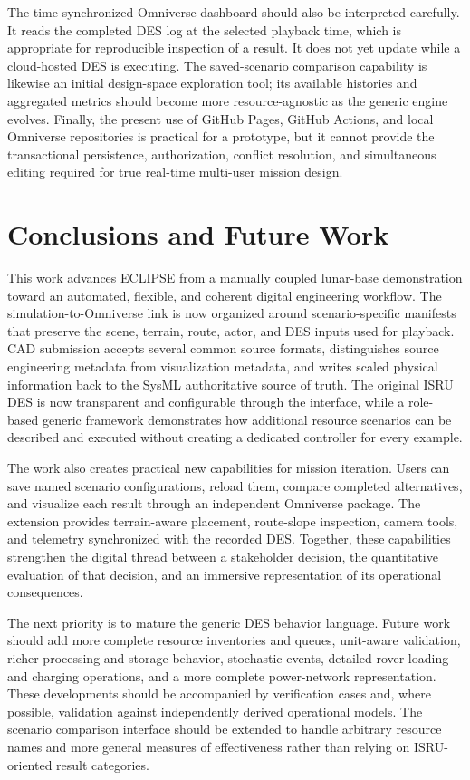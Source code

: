The time-synchronized Omniverse dashboard should also be interpreted carefully. It reads the completed DES log at the selected playback time, which is appropriate for reproducible inspection of a result. It does not yet update while a cloud-hosted DES is executing. The saved-scenario comparison capability is likewise an initial design-space exploration tool; its available histories and aggregated metrics should become more resource-agnostic as the generic engine evolves. Finally, the present use of GitHub Pages, GitHub Actions, and local Omniverse repositories is practical for a prototype, but it cannot provide the transactional persistence, authorization, conflict resolution, and simultaneous editing required for true real-time multi-user mission design.

\section{Conclusions and Future Work}

This work advances ECLIPSE from a manually coupled lunar-base demonstration toward an automated, flexible, and coherent digital engineering workflow. The simulation-to-Omniverse link is now organized around scenario-specific manifests that preserve the scene, terrain, route, actor, and DES inputs used for playback. CAD submission accepts several common source formats, distinguishes source engineering metadata from visualization metadata, and writes scaled physical information back to the SysML authoritative source of truth. The original ISRU DES is now transparent and configurable through the interface, while a role-based generic framework demonstrates how additional resource scenarios can be described and executed without creating a dedicated controller for every example.

The work also creates practical new capabilities for mission iteration. Users can save named scenario configurations, reload them, compare completed alternatives, and visualize each result through an independent Omniverse package. The extension provides terrain-aware placement, route-slope inspection, camera tools, and telemetry synchronized with the recorded DES. Together, these capabilities strengthen the digital thread between a stakeholder decision, the quantitative evaluation of that decision, and an immersive representation of its operational consequences.

The next priority is to mature the generic DES behavior language. Future work should add more complete resource inventories and queues, unit-aware validation, richer processing and storage behavior, stochastic events, detailed rover loading and charging operations, and a more complete power-network representation. These developments should be accompanied by verification cases and, where possible, validation against independently derived operational models. The scenario comparison interface should be extended to handle arbitrary resource names and more general measures of effectiveness rather than relying on ISRU-oriented result categories.

